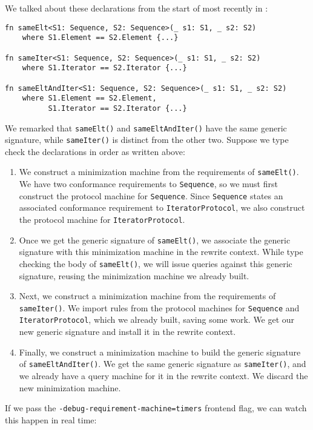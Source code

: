 \documentclass[../generics]{subfiles}
\begin{document}
\begin{example}
We talked about these declarations from the start of  most recently in :
\begin{Verbatim}
fn sameElt<S1: Sequence, S2: Sequence>(_ s1: S1, _ s2: S2)
    where S1.Element == S2.Element {...}

fn sameIter<S1: Sequence, S2: Sequence>(_ s1: S1, _ s2: S2)
    where S1.Iterator == S2.Iterator {...}

fn sameEltAndIter<S1: Sequence, S2: Sequence>(_ s1: S1, _ s2: S2)
    where S1.Element == S2.Element,
          S1.Iterator == S2.Iterator {...}
\end{Verbatim}
We remarked that \texttt{sameElt()} and \texttt{sameEltAndIter()} have the same generic signature, while \texttt{sameIter()} is distinct from the other two. Suppose we type check the declarations in order as written above:
\begin{enumerate}
\item We construct a minimization machine from the requirements of \texttt{sameElt()}. We have two conformance requirements to \texttt{Sequence}, so we must first construct the protocol machine for \texttt{Sequence}. Since \texttt{Sequence} states an associated conformance requirement to \texttt{IteratorProtocol}, we also construct the protocol machine for \texttt{IteratorProtocol}.
\item Once we get the generic signature of \texttt{sameElt()}, we associate the generic signature with this minimization machine in the rewrite context. While type checking the body of \texttt{sameElt()}, we will issue queries against this generic signature, reusing the minimization machine we already built.
\item Next, we construct a minimization machine from the requirements of \texttt{sameIter()}. We import rules from the protocol machines for \texttt{Sequence} and \texttt{IteratorProtocol}, which we already built, saving some work. We get our new generic signature and install it in the rewrite context.
\item Finally, we construct a minimization machine to build the generic signature of \texttt{sameEltAndIter()}. We get the same generic signature as \texttt{sameIter()}, and we already have a query machine for it in the rewrite context. We discard the new minimization machine.
\end{enumerate}
If we pass the \texttt{-debug-requirement-machine=timers} frontend flag, we can watch this happen in real time:

\end{example}
\end{document}
